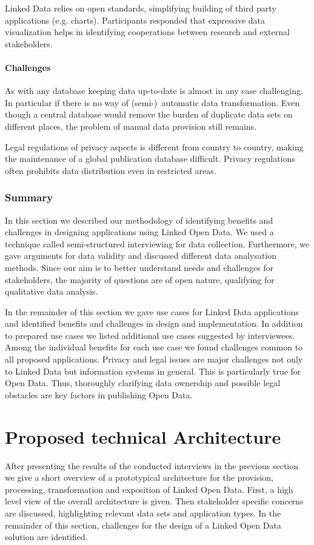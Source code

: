 \documentclass{article}
\begin{document}
Linked Data relies on open standards, simplifying building of third party applications (e.g. charts). Participants responded that expressive data visualization helps in identifying cooperations between research and external stakeholders.  
\paragraph{Challenges}
As with any database keeping data up-to-date is almost in any case challenging. In particular if there is no way of (semi-)~automatic data transformation. Even though a central database would remove the burden of duplicate data sets on different places, the problem of manual data provision still remains. 

Legal regulations of privacy aspects is different from country to country, making the maintenance of a global publication database difficult. Privacy regulations often prohibits data distribution even in restricted areas. 
\subsubsection{Summary}
In this section we described our methodology of identifying benefits and challenges in designing applications using Linked Open Data. We used a technique called semi-structured interviewing for data collection. Furthermore, we gave arguments for data validity and discussed different data analysation methods. Since our aim is to better understand needs and challenges for stakeholders, the majority of questions are of open nature, qualifying for qualitative data analysis. 

In the remainder of this section we gave use cases for Linked Data applications and identified benefits and challenges in design and implementation. In addition to prepared use cases we listed additional use cases suggested by interviewees. Among the individual benefits for each use case we found challenges common to all proposed applications. Privacy and legal issues are major challenges not only to Linked Data but information systems in general. This is particularly true for Open Data. Thus, thoroughly clarifying data ownership and possible legal obstacles are key factors in publishing Open Data. 

\section{Proposed technical Architecture}
After presenting the results of the conducted interviews in the previous section we give a short overview of a prototypical architecture for the provision, processing, transformation and exposition of Linked Open Data. First, a high level view of the overall architecture is given. Then stakeholder specific concerns are discussed, highlighting relevant data sets and application types. In the remainder of this section, challenges for the design of a Linked Open Data solution are identified. 
\end{document}
